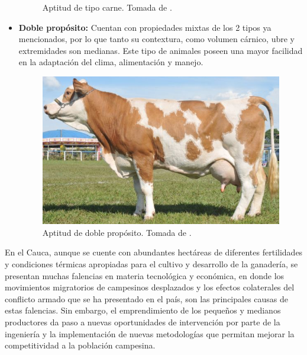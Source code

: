 \begin{itemize}
\begin{figure}[H]
\begin{center}
 \end{center}
 \caption{Aptitud de tipo carne. Tomada de \cite{googlepics}. }
\end{figure}
\item \textbf{Doble propósito:} Cuentan con propiedades mixtas de los 2 tipos ya mencionados, por lo que tanto su contextura, como volumen cárnico, ubre y extremidades son medianas. Este tipo de animales poseen una mayor facilidad en la adaptación del clima, alimentación y manejo. 
\begin{figure}[H]
 \begin{center}
 \includegraphics[scale=0.55]{img/dibujito4.png}
 \end{center}
 \caption{Aptitud de doble propósito.  Tomada de \cite{googlepics}. \label{}}
\end{figure}
\end{itemize}



En el Cauca, aunque se cuente con abundantes hectáreas de diferentes fertilidades y condiciones térmicas apropiadas para el cultivo y desarrollo de la ganadería, se presentan muchas falencias en materia tecnológica y económica, en donde los movimientos migratorios de campesinos desplazados y los efectos colaterales del conflicto armado que se ha presentado en el país, son las principales causas de estas falencias. Sin embargo, el emprendimiento de los pequeños y medianos productores da paso a nuevas oportunidades de intervención por parte de la ingeniería y la implementación de nuevas metodologías que permitan mejorar la competitividad a la población campesina.\\

